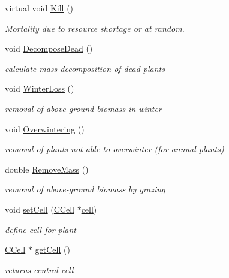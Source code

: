 \begin{DoxyCompactItemize}
virtual void \mbox{\hyperlink{class_c_plant_a79fb5e9ec6b21eb939a25252c8cca2e2}{Kill}} ()
\begin{DoxyCompactList}\small\item\em Mortality due to resource shortage or at random. \end{DoxyCompactList}\item 
void \mbox{\hyperlink{class_c_plant_a85a5028cbe8028f6c5222f2d32fb21da}{Decompose\+Dead}} ()
\begin{DoxyCompactList}\small\item\em calculate mass decomposition of dead plants \end{DoxyCompactList}\item 
void \mbox{\hyperlink{class_c_plant_a1e8eb53d535dea92050fcb19dcbb9538}{Winter\+Loss}} ()
\begin{DoxyCompactList}\small\item\em removal of above-\/ground biomass in winter \end{DoxyCompactList}\item 
void \mbox{\hyperlink{class_c_plant_a80e89c9f8cefee43ac3020974ae0850b}{Overwintering}} ()
\begin{DoxyCompactList}\small\item\em removal of plants not able to overwinter (for annual plants) \end{DoxyCompactList}\item 
double \mbox{\hyperlink{class_c_plant_aa39451abceca77342e6bdbc90ebf425e}{Remove\+Mass}} ()
\begin{DoxyCompactList}\small\item\em removal of above-\/ground biomass by grazing \end{DoxyCompactList}\item 
void \mbox{\hyperlink{class_c_plant_a8e9f7d1261306165ecca0cf951f50505}{set\+Cell}} (\mbox{\hyperlink{class_c_cell}{C\+Cell}} $\ast$\mbox{\hyperlink{class_c_plant_aa4e3f8bc03674d5017a44b6bc01faf4e}{cell}})
\begin{DoxyCompactList}\small\item\em define cell for plant \end{DoxyCompactList}\item 
\mbox{\label{class_c_plant_ac8dd4dc4797ecb0881131f9c44d3cd4d}} 
\mbox{\hyperlink{class_c_cell}{C\+Cell}} $\ast$ \mbox{\hyperlink{class_c_plant_ac8dd4dc4797ecb0881131f9c44d3cd4d}{get\+Cell}} ()
\begin{DoxyCompactList}\small\item\em returns central cell \end{DoxyCompactList}\item 

\end{DoxyCompactItemize}
